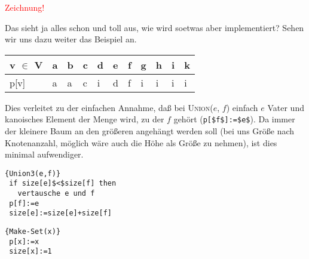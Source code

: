 \textcolor{red}{Zeichnung!}

Das sieht ja alles schon und toll aus, wie wird soetwas aber implementiert? Sehen wir uns dazu weiter das Beispiel an.

\begin{tabular}{l|llllllllll}
v $\in$ V & a & b & c & d & e & f & g & h & i & k\\
\hline
p[v] & a & a & c & i & d & f & i & i & i & i\\
\end{tabular}

Dies verleitet zu der einfachen Annahme, daß bei \textsc{Union}($e$, $f$) einfach $e$ Vater und kanoisches Element der
Menge wird, zu der $f$ gehört (\lstinline[mathescape=true]!p[$f$]:=$e$!). Da immer der kleinere Baum an den größeren
angehängt werden soll (bei uns Größe nach Knotenanzahl, möglich wäre auch die Höhe als Größe zu nehmen), ist
dies minimal aufwendiger.

\begin{Algorithmus}[H]
\begin{lstlisting}[frame=tlrb, mathescape=true, title=\textsc{Union\textnormal{(e, f)}},gobble=1]{Union3(e,f)}
 if size[e]$<$size[f] then
   vertausche e und f
 p[f]:=e
 size[e]:=size[e]+size[f]  
\end{lstlisting}
\end{Algorithmus} 

\begin{Algorithmus}[H]
\begin{lstlisting}[frame=tlrb, mathescape=true, title=\textsc{Make-Set\textnormal{(x)}},gobble=1]{Make-Set(x)}
 p[x]:=x
 size[x]:=1  
\end{lstlisting}
\end{Algorithmus} 

